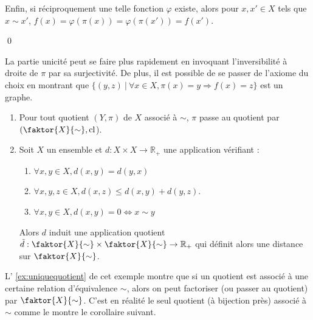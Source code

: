 \begin{proofe}

  Enfin, si réciproquement une telle fonction $\varphi$ existe, alors pour $x,x' \in X$ tels que 
  $x \sim x'$, $f(x) = \varphi(\pi (x)) = \varphi(\pi (x')) = f(x')$.

\qed

\end{proofe}

\begin{remark}
    La partie unicité peut se faire plus rapidement en invoquant l'inversibilité à droite de $\pi $ par sa surjectivité.
    De plus, il est possible de se passer de l'axiome du choix en montrant que 
    $\{ (y,z) ~|~ \forall x \in X , \pi (x) = y \Rightarrow f(x)=z\}$ est un graphe.
\end{remark}

\begin{example}
  \label{ex:uniquequotient}
\blank
  \begin{enumerate}
    \item 
      Pour tout quotient $(Y,\pi )$ de $X$ associé à $\sim$, $\pi $ passe au quotient par $(\faktor{X}{\sim},\textup{cl}$).
    \item Soit $X$ un ensemble et $d : X \times X \to \mathbb{R}_+$ une application vérifiant :

    \begin{enumerate}
      \item $\forall x,y \in X, d(x,y) = d(y,x)$
      \item $\forall x,y,z \in X, d(x,z) \leq d(x,y) + d(y,z)$.
      \item $\forall x,y \in X, d(x,y) = 0 \Leftrightarrow x \sim y$
    \end{enumerate}

    Alors $d$ induit une application quotient $\tilde{d} : \faktor{X}{\sim }  \times \faktor{X}{\sim } \to \mathbb{R}_+$
    qui définit alors une distance sur $\faktor{X}{\sim }$.
  \end{enumerate}
\end{example}

L' \cref{ex:uniquequotient} de cet exemple montre que si un quotient est associé à une certaine
relation d'équivalence $\sim$, alors on peut factoriser (ou passer au quotient) par $\faktor{X}{\sim}$.
C'est en réalité le seul quotient (à bijection près) associé à $\sim$ comme le montre le corollaire suivant.

